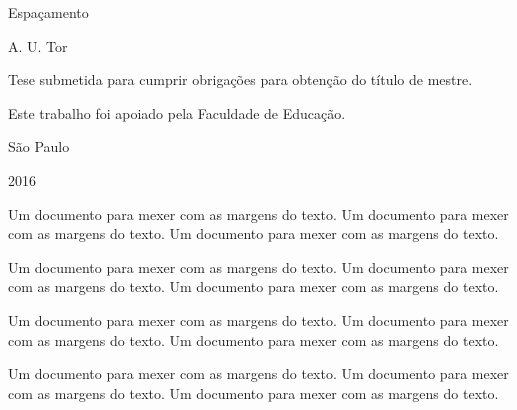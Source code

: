 \documentclass[12pt,article,a4paper,oneside]{memoir}
\begin{document}
\vspace*{5cm} %

\begin{center}
{\Huge Espaçamento }

\bigskip

{\Large A. U. Tor }
\end{center}

\vspace*{\fill} %

\begin{flushright} %
\begin{minipage}{0.5\textwidth}
Tese submetida
para cumprir obrigações
para obtenção do título
de mestre.

Este trabalho foi apoiado
pela Faculdade de Educação.
\end{minipage}
\end{flushright}

%
%



\vspace*{5cm}

\begin{center}
São Paulo

2016
\end{center}

\newpage

Um documento para mexer com as margens do texto. Um documento para mexer com as margens do texto. Um documento para mexer com as margens do texto. 

Um documento para mexer com as margens do texto. Um documento para mexer com as margens do texto. Um documento para mexer com as margens do texto. 

\smallskip %

Um documento para mexer com as margens do texto. Um documento para mexer com as margens do texto. Um documento para mexer com as margens do texto. 

\medskip %

Um documento para mexer com as margens do texto. Um documento para mexer com as margens do texto. Um documento para mexer com as margens do texto. 
\end{document}
